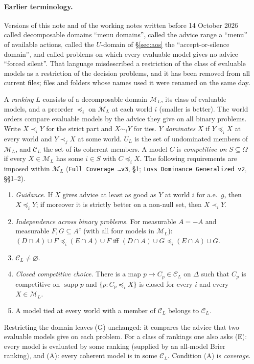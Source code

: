 \documentclass[11pt]{article}
\theoremstyle{definition}
\theoremstyle{remark}
\newcommand{\M}{\mathcal M}
\newcommand{\C}{\mathcal C}
\newcommand{\supp}{\operatorname{supp}}
\newcommand{\src}[1]{\texttt{#1}}
\begin{document}
\paragraph{Earlier terminology.} Versions of this note and of the working notes written before 14 October 2026 called decomposable domains ``menu domains'', called the advice range a ``menu'' of available actions, called the $U$-domain of \S\ref{sec:aos} the ``accept-or-silence domain'', and called problems on which every evaluable model gives no advice ``forced silent''. That language misdescribed a restriction of the class of evaluable models as a restriction of the decision problems, and it has been removed from all current files; files and folders whose names used it were renamed on the same day.

A \emph{ranking} $L$ consists of a decomposable domain $\M_L$, its class of evaluable models, and a preorder $\preceq_i$ on $\M_L$ at each world $i$ (smaller is better). The world orders compare evaluable models by the advice they give on all binary problems. Write $X\prec_iY$ for the strict part and $X\sim_iY$ for ties. $Y$ \emph{dominates} $X$ if $Y\preceq_iX$ at every world and $Y\prec_jX$ at some world. $U_L$ is the set of undominated members of $\M_L$, and $\C_L$ the set of its coherent members. A model $C$ is \emph{competitive on} $S\subseteq\Omega$ if every $X\in\M_L$ has some $i\in S$ with $C\preceq_iX$. The following requirements are imposed within $\M_L$ (\src{Full Coverage \dots v3}, \S1; \src{Loss Dominance Generalized v2}, \S\S1--2).
\begin{enumerate}[leftmargin=*,label=\textbf{(\arabic*)}]
\item[\textbf{(G)}] \emph{Guidance.} If $X$ gives advice at least as good as $Y$ at world $i$ for a.e.\ $g$, then $X\preceq_iY$; if moreover it is strictly better on a non-null set, then $X\prec_iY$.
\item[\textbf{(IB)}] \emph{Independence across binary problems.} For measurable $A=-A$ and measurable $F,G\subseteq A^c$ (with all four models in $\M_L$): $(D\cap A)\cup F\preceq_i(E\cap A)\cup F$ iff $(D\cap A)\cup G\preceq_i(E\cap A)\cup G$.
\item[\textbf{(LA)}] $\C_L\ne\varnothing$.
\item[\textbf{(S)}] \emph{Closed competitive choice.} There is a map $p\mapsto C_p\in\C_L$ on $\Delta$ such that $C_p$ is competitive on $\supp p$ and $\{p:C_p\preceq_iX\}$ is closed for every $i$ and every $X\in\M_L$.
\item[\textbf{(C)}] A model tied at every world with a member of $\C_L$ belongs to $\C_L$.
\end{enumerate}
Restricting the domain leaves (G) unchanged: it compares the advice that two evaluable models give on each problem. For a class of rankings one also asks (E): every model is evaluated by some ranking (supplied by an all-model Brier ranking), and (A): every coherent model is in some $\C_L$. Condition (A) is \emph{coverage}.
\end{document}
